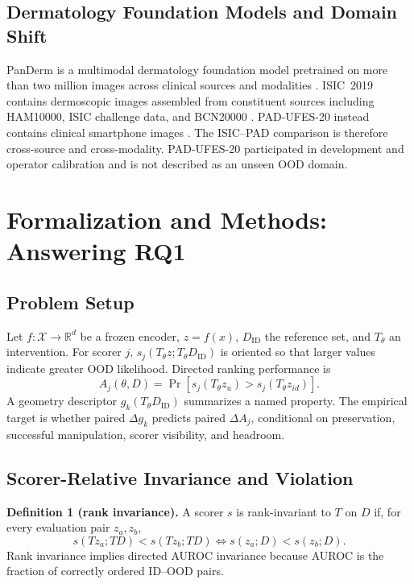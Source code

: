 \documentclass[11pt,a4paper]{article}
\begin{document}
\subsection{Dermatology Foundation Models and Domain Shift}
PanDerm is a multimodal dermatology foundation model pretrained on more than two million images across clinical sources and modalities \cite{b12}. ISIC~2019 contains dermoscopic images assembled from constituent sources including HAM10000, ISIC challenge data, and BCN20000 \cite{b13,b14,b15}. PAD-UFES-20 instead contains clinical smartphone images \cite{b16}. The ISIC--PAD comparison is therefore cross-source and cross-modality. PAD-UFES-20 participated in development and operator calibration and is not described as an unseen OOD domain.

\section{Formalization and Methods: Answering RQ1}
\subsection{Problem Setup}
Let $f:\mathcal{X}\rightarrow\mathbb{R}^{d}$ be a frozen encoder, $z=f(x)$, $D_{\mathrm{ID}}$ the reference set, and $T_\theta$ an intervention. For scorer $j$, $s_j(T_\theta z;T_\theta D_{\mathrm{ID}})$ is oriented so that larger values indicate greater OOD likelihood. Directed ranking performance is
\begin{equation}
A_j(\theta,D)=\Pr\!\left[s_j(T_\theta z_u)>s_j(T_\theta z_{id})\right].
\end{equation}
A geometry descriptor $g_k(T_\theta D_{\mathrm{ID}})$ summarizes a named property. The empirical target is whether paired $\Delta g_k$ predicts paired $\Delta A_j$, conditional on preservation, successful manipulation, scorer visibility, and headroom.

\subsection{Scorer-Relative Invariance and Violation}
\textbf{Definition 1 (rank invariance).} A scorer $s$ is rank-invariant to $T$ on $D$ if, for every evaluation pair $z_a,z_b$,
\begin{equation}
s(Tz_a;TD)<s(Tz_b;TD)\iff s(z_a;D)<s(z_b;D).
\end{equation}
Rank invariance implies directed AUROC invariance because AUROC is the fraction of correctly ordered ID--OOD pairs.
\end{document}
